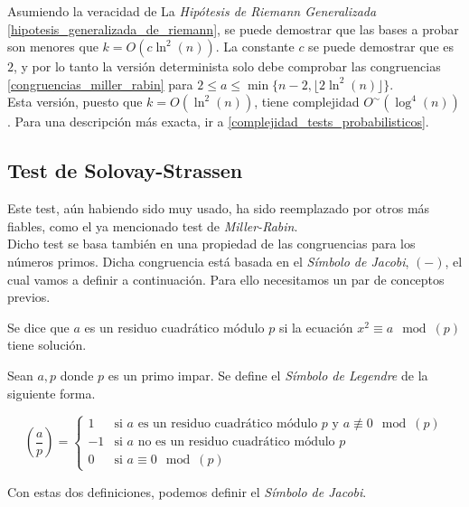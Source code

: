 Asumiendo la veracidad de La \textit{Hipótesis de Riemann Generalizada} \ref{hipotesis_generalizada_de_riemann}, se puede demostrar que las bases a probar son menores que $k = O(c\ln^2(n))$. La constante $c$ se puede demostrar que es $2$, y por lo tanto la versión determinista solo debe comprobar las congruencias \eqref{congruencias_miller_rabin} para $2 \leq a \leq \min\{n-2, \lfloor 2\ln^2(n) \rfloor\}$.\\

Esta versión, puesto que $k = O(\ln^2(n))$, tiene complejidad $O^\sim(\log^4(n))$. Para una descripción más exacta, ir a \autoref{complejidad_tests_probabilisticos}.

\subsection{Test de Solovay-Strassen}

Este test, aún habiendo sido muy usado, ha sido reemplazado por otros más fiables, como el ya mencionado test de \textit{Miller-Rabin}.\\

Dicho test se basa también en una propiedad de las congruencias para los números primos. Dicha congruencia está basada en el \textit{Símbolo de Jacobi}, $(-)$, el cual vamos a definir a continuación. Para ello necesitamos un par de conceptos previos.

\begin{definicion}
	Se dice que $a$ es un residuo cuadrático módulo $p$ si la ecuación $x^2 \equiv a \mod(p)$ tiene solución.
\end{definicion}

\begin{definicion}\label{simbolo_de_legendre}
	Sean $a, p$ donde $p$ es un primo impar. Se define el \textit{Símbolo de Legendre} de la siguiente forma.
	
	\begin{equation}
	\left(\frac{a}{p}\right) =
	\begin{cases}
		1 &\text{si $a$ es un residuo cuadrático módulo $p$ y $a \not\equiv 0 \mod(p)$}\\
		-1 &\text{si $a$ no es un residuo cuadrático módulo $p$}\\
		0 &\text{si $a \equiv 0 \mod(p)$}
	\end{cases}
	\end{equation}
\end{definicion}

Con estas dos definiciones, podemos definir el \textit{Símbolo de Jacobi}.

